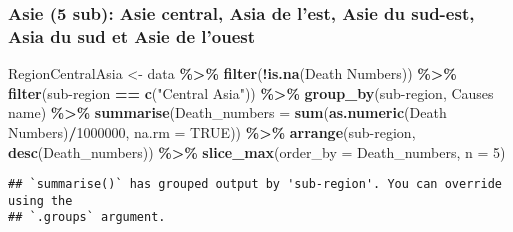 \documentclass[
]{article}
\newenvironment{Shaded}{\begin{snugshade}}{\end{snugshade}}
\newcommand{\AttributeTok}[1]{\textcolor[rgb]{0.13,0.29,0.53}{#1}}
\newcommand{\ConstantTok}[1]{\textcolor[rgb]{0.56,0.35,0.01}{#1}}
\newcommand{\DecValTok}[1]{\textcolor[rgb]{0.00,0.00,0.81}{#1}}
\newcommand{\FunctionTok}[1]{\textcolor[rgb]{0.13,0.29,0.53}{\textbf{#1}}}
\newcommand{\NormalTok}[1]{#1}
\newcommand{\OtherTok}[1]{\textcolor[rgb]{0.56,0.35,0.01}{#1}}
\newcommand{\SpecialCharTok}[1]{\textcolor[rgb]{0.81,0.36,0.00}{\textbf{#1}}}
\newcommand{\StringTok}[1]{\textcolor[rgb]{0.31,0.60,0.02}{#1}}
\begin{document}
\hypertarget{asie-5-sub-asie-central-asia-de-lest-asie-du-sud-est-asia-du-sud-et-asie-de-louest}{%
\subsubsection{Asie (5 sub): Asie central, Asia de l'est, Asie du
sud-est, Asia du sud et Asie de
l'ouest}\label{asie-5-sub-asie-central-asia-de-lest-asie-du-sud-est-asia-du-sud-et-asie-de-louest}}

\begin{Shaded}
\begin{Highlighting}[]
\NormalTok{RegionCentralAsia }\OtherTok{\textless{}{-}}\NormalTok{ data }\SpecialCharTok{\%\textgreater{}\%}
  \FunctionTok{filter}\NormalTok{(}\SpecialCharTok{!}\FunctionTok{is.na}\NormalTok{(}\StringTok{\textasciigrave{}}\AttributeTok{Death Numbers}\StringTok{\textasciigrave{}}\NormalTok{)) }\SpecialCharTok{\%\textgreater{}\%}
  \FunctionTok{filter}\NormalTok{(}\StringTok{\textasciigrave{}}\AttributeTok{sub{-}region}\StringTok{\textasciigrave{}} \SpecialCharTok{==} \FunctionTok{c}\NormalTok{(}\StringTok{"Central Asia"}\NormalTok{)) }\SpecialCharTok{\%\textgreater{}\%}
  \FunctionTok{group\_by}\NormalTok{(}\StringTok{\textasciigrave{}}\AttributeTok{sub{-}region}\StringTok{\textasciigrave{}}\NormalTok{, }\StringTok{\textasciigrave{}}\AttributeTok{Causes name}\StringTok{\textasciigrave{}}\NormalTok{) }\SpecialCharTok{\%\textgreater{}\%}
  \FunctionTok{summarise}\NormalTok{(}\AttributeTok{Death\_numbers =} \FunctionTok{sum}\NormalTok{(}\FunctionTok{as.numeric}\NormalTok{(}\StringTok{\textasciigrave{}}\AttributeTok{Death Numbers}\StringTok{\textasciigrave{}}\NormalTok{)}\SpecialCharTok{/}\DecValTok{1000000}\NormalTok{, }\AttributeTok{na.rm =} \ConstantTok{TRUE}\NormalTok{)) }\SpecialCharTok{\%\textgreater{}\%}
  \FunctionTok{arrange}\NormalTok{(}\StringTok{\textasciigrave{}}\AttributeTok{sub{-}region}\StringTok{\textasciigrave{}}\NormalTok{, }\FunctionTok{desc}\NormalTok{(Death\_numbers)) }\SpecialCharTok{\%\textgreater{}\%}
  \FunctionTok{slice\_max}\NormalTok{(}\AttributeTok{order\_by =}\NormalTok{ Death\_numbers, }\AttributeTok{n =} \DecValTok{5}\NormalTok{)}
\end{Highlighting}
\end{Shaded}

\begin{verbatim}
## `summarise()` has grouped output by 'sub-region'. You can override using the
## `.groups` argument.
\end{verbatim}
\end{document}
